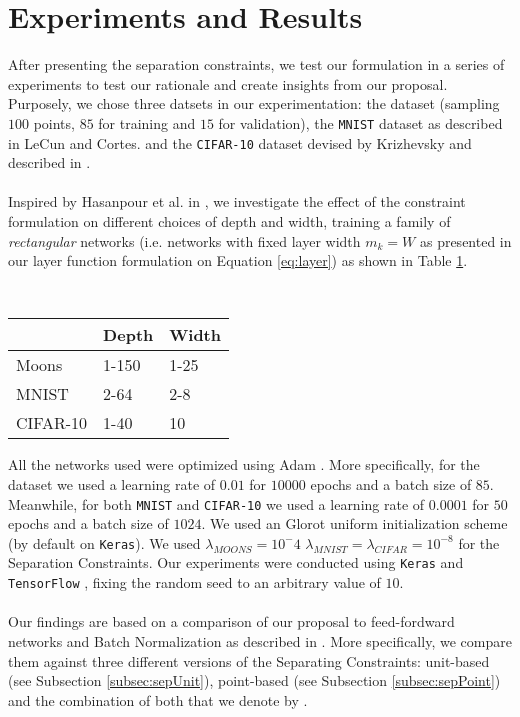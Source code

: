 \section{Experiments and Results}\label{sec:experiments}
After presenting the separation constraints, we test our formulation in a series of experiments to test our rationale and create insights from our proposal. Purposely, we chose three datsets in our experimentation: the \moons dataset (sampling $100$ points, $85$ for training and $15$ for validation), the \texttt{MNIST} dataset as described in LeCun and Cortes. \cite{mnist} and the \texttt{CIFAR-10} dataset devised by Krizhevsky and described in \cite{cifar10}.
\\\\
Inspired by Hasanpour et al. in \cite{simpnet}, we investigate the effect of the constraint formulation on different choices of depth and width, training a family of \emph{rectangular} networks (i.e. networks with fixed layer width $m_k=W$ as presented in our layer function formulation on Equation \ref{eq:layer}) as shown in Table \ref{tab:grids}.
\\\\

\begin{table}[]
\centering
\begin{tabular}{@{}lll@{}}
\toprule
         & Depth & Width \\ \midrule
Moons    & 1-150 & 1-25  \\
MNIST    & 2-64  & 2-8   \\
CIFAR-10 & 1-40  & 10    \\ \bottomrule
\end{tabular}
\caption{}\label{tab:grids}
\end{table}

All the networks used were optimized using Adam \cite{adam}. More specifically, for the \moons dataset we used a learning rate of $0.01$ for $10000$ epochs and a batch size of $85$. Meanwhile, for both \texttt{MNIST} and \texttt{CIFAR-10} we used a learning rate of $0.0001$ for $50$ epochs and a batch size of $1024$. We used an Glorot uniform initialization scheme \cite{Glorot10Initialization} (by default on \texttt{Keras}). We used $\lambda_{MOONS}=10^-4$ $\lambda_{MNIST}=\lambda_{CIFAR}=10^{-8}$ for the Separation Constraints. Our experiments were conducted using \texttt{Keras} \cite{keras} and \texttt{TensorFlow} \cite{tensorflow}, fixing the random seed to an arbitrary value of $10$. 
\\\\
Our findings are based on a comparison of our proposal to feed-fordward \ReLU networks \cite{relu} and Batch Normalization as described in \cite{batchnorm}. More specifically, we compare them against three different versions of the Separating Constraints: unit-based \SepUnit (see Subsection \ref{subsec:sepUnit}), point-based \SepPoint (see Subsection \ref{subsec:sepPoint}) and the combination of both that we denote by \SepUnitPoint.
\\\\

